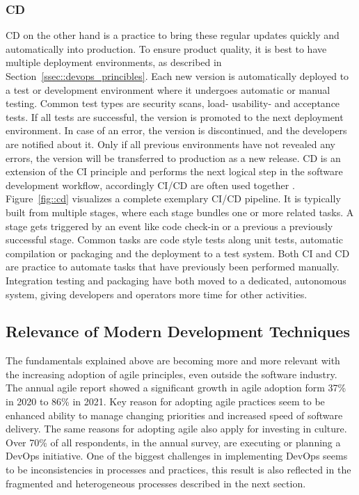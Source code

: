 \documentclass[12pt, a4paper]{article}
\begin{document}
    \subsubsection{\acl{CD}}
    \acl{CD} on the other hand is a practice to bring these regular updates quickly and automatically into production. To ensure product quality, it is best to have multiple deployment environments, as described in Section~\ref{ssec::devops_princibles}. Each new version is automatically deployed to a test or development environment where it undergoes automatic or manual testing. Common test types are security scans, load- usability- and acceptance tests. If all tests are successful, the version is promoted to the next deployment environment. In case of an error, the version is discontinued, and the developers are notified about it. Only if all previous environments have not revealed any errors, the version will be transferred to production as a new release. \ac{CD} is an extension of the \ac{CI} principle and performs the next logical step in the software development workflow, accordingly \ac{CI}/\ac{CD} are often used together \cite{azuredevops}.\newline
    Figure~\ref{fig::cd} visualizes a complete exemplary \ac{CI}/\ac{CD} pipeline. It is typically built from multiple stages, where each stage bundles one or more related tasks. A stage gets triggered by an event like code check-in or a previous a previously successful stage. Common tasks are code style tests along unit tests, automatic compilation or packaging and the deployment to a test system.\newline
    Both \ac{CI} and \ac{CD} are practice to automate tasks that have previously been performed manually. Integration testing and packaging have both moved to a dedicated, autonomous system, giving developers and operators more time for other activities.
    

    \subsection{Relevance of Modern Development Techniques}
    The fundamentals explained above are becoming more and more relevant with the increasing adoption of agile principles, even outside the software industry. The annual agile report showed a significant growth in agile adoption form 37\% in 2020 to 86\% in 2021. Key reason for adopting agile practices seem to be enhanced ability to manage changing priorities and increased speed of software delivery. The same reasons for adopting agile also apply for investing in culture. Over 70\% of all respondents, in the annual survey, are executing or planning a DevOps initiative. One of the biggest challenges in implementing DevOps seems to be inconsistencies in processes and practices, this result is also reflected in the fragmented and heterogeneous processes described in the next section. \cite{agilereport2021}
\end{document}
